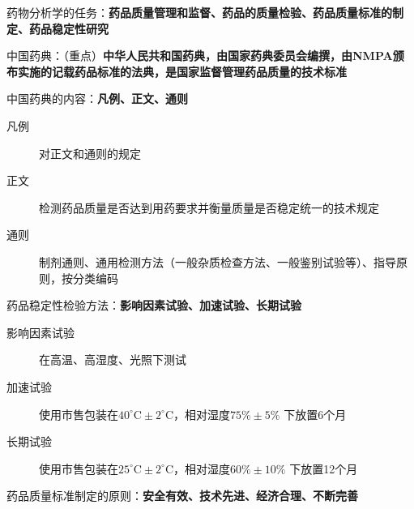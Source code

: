 \begin{notation}
    药物分析学的任务：\textbf{药品质量管理和监督、药品的质量检验、药品质量标准的制定、药品稳定性研究}
\end{notation}
\begin{notation}
中国药典：（重点）\textbf{中华人民共和国药典，由国家药典委员会编撰，由NMPA颁布实施的记载药品标准的法典，是国家监督管理药品质量的技术标准}

中国药典的内容：\textbf{凡例、正文、通则}
\begin{description}
    \item[凡例] 对正文和通则的规定
    \item [正文] 检测药品质量是否达到用药要求并衡量质量是否稳定统一的技术规定
    \item [通则] 制剂通则、通用检测方法（一般杂质检查方法、一般鉴别试验等）、指导原则，按分类编码
\end{description}
\end{notation}
\begin{notation}
    药品稳定性检验方法：\textbf{影响因素试验、加速试验、长期试验}
    \begin{description}
        \item[影响因素试验] 在高温、高湿度、光照下测试
        \item [加速试验] 使用市售包装在$40^\circ\text{C}\pm 2^\circ\text{C}$，相对湿度$75\%\pm 5\%$ 下放置6个月
        \item [长期试验] 使用市售包装在$25^\circ\text{C}\pm 2^\circ\text{C}$，相对湿度$60\%\pm 10\%$ 下放置12个月
    \end{description}
\end{notation}
\begin{notation}
    药品质量标准制定的原则：\textbf{安全有效、技术先进、经济合理、不断完善}
\end{notation}

